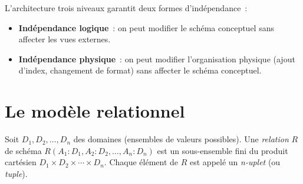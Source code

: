 \begin{center}
\end{center}

\begin{theoreme}
L'architecture trois niveaux garantit deux formes d'ind\'ependance~:
\begin{itemize}
    \item \textbf{Ind\'ependance logique}~: on peut modifier le sch\'ema conceptuel
          sans affecter les vues externes.
    \item \textbf{Ind\'ependance physique}~: on peut modifier l'organisation physique
          (ajout d'index, changement de format) sans affecter le sch\'ema conceptuel.
\end{itemize}
\end{theoreme}

\section{Le mod\`ele relationnel}

\begin{definition}[Relation]
Soit $D_1, D_2, \ldots, D_n$ des domaines (ensembles de valeurs possibles).
Une \emph{relation} $R$ de sch\'ema $R(A_1:D_1, A_2:D_2, \ldots, A_n:D_n)$
est un sous-ensemble fini du produit cart\'esien $D_1 \times D_2 \times \cdots \times D_n$.
Chaque \'el\'ement de $R$ est appel\'e un \emph{n-uplet} (ou \emph{tuple}).
\end{definition}

